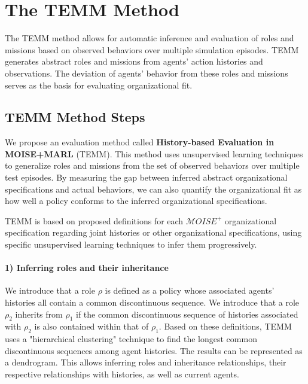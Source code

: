 \documentclass[sigconf,anonymous]{aamas}
\begin{document}
\section{The TEMM Method}
\label{sec:TEMM_algorithm}
The TEMM method allows for automatic inference and evaluation of roles and missions based on observed behaviors over multiple simulation episodes. TEMM generates abstract roles and missions from agents' action histories and observations. The deviation of agents' behavior from these roles and missions serves as the basis for evaluating organizational fit.

\subsection{TEMM Method Steps}

%     

We propose an evaluation method called \textbf{History-based Evaluation in MOISE+MARL} (TEMM). This method uses unsupervised learning techniques to generalize roles and missions from the set of observed behaviors over multiple test episodes. By measuring the gap between inferred abstract organizational specifications and actual behaviors, we can also quantify the organizational fit as how well a policy conforms to the inferred organizational specifications.

TEMM is based on proposed definitions for each $\mathcal{M}OISE^+$ organizational specification regarding joint histories or other organizational specifications, using specific unsupervised learning techniques to infer them progressively.

\paragraph{\textbf{1) Inferring roles and their inheritance}}

We introduce that a role $\rho$ is defined as a policy whose associated agents' histories all contain a common discontinuous sequence. We introduce that a role $\rho_2$ inherits from $\rho_1$ if the common discontinuous sequence of histories associated with $\rho_2$ is also contained within that of $\rho_1$.
Based on these definitions, TEMM uses a "hierarchical clustering" technique to find the longest common discontinuous sequences among agent histories. The results can be represented as a dendrogram. This allows inferring roles and inheritance relationships, their respective relationships with histories, as well as current agents.
\end{document}
